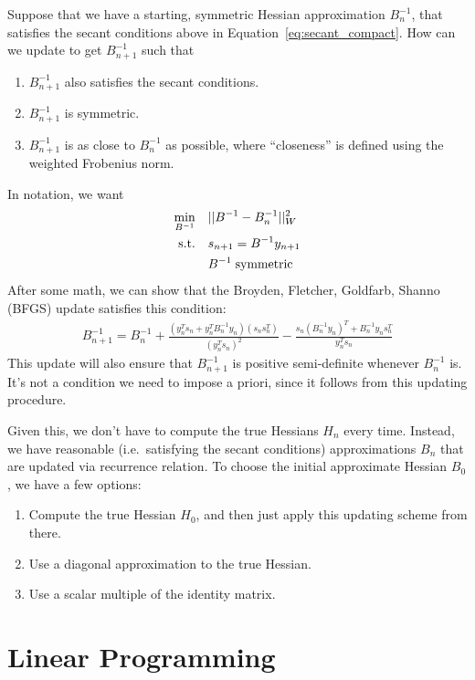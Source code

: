 \documentclass[a4paper,12pt]{scrartcl}
\theoremstyle{definition}
\theoremstyle{remark}
\begin{document}
Suppose that we have a starting, symmetric Hessian approximation $B^{-1}_n$,
that satisfies the secant conditions above in
Equation~\ref{eq:secant_compact}. How can we update to get $B^{-1}_{n+1}$
such that
\begin{enumerate}
  \item $B^{-1}_{n+1}$ also satisfies the secant conditions.
  \item $B^{-1}_{n+1}$ is symmetric.
  \item $B^{-1}_{n+1}$ is as close to $B^{-1}_n$ as possible, where
    ``closeness'' is defined using the weighted Frobenius norm.
\end{enumerate}
In notation, we want
\begin{align*}
  \min_{B^{-1}} &\quad ||B^{-1} - B^{-1}_n||^2_W \\
  \text{s.t.} &\quad s_{n+1} = B^{-1}y_{n+1} \\
              &\quad B^{-1} \text{\;symmetric}
\end{align*}
After some math, we can show that the Broyden, Fletcher, Goldfarb,
Shanno (BFGS) update satisfies this condition:
\begin{align}
  B_{n+1}^{-1} = B^{-1}_n
  + \frac{(y_n^T s_n + y_n^T B^{-1}_n y_n)(s_n s_n^T)}{(y_n^T s_n)^2}
  - \frac{s_n (B^{-1}_n y_n)^T + B^{-1}_n y_n s_n^T}{y_n^T s_n}
  \label{eq:bfgs}
\end{align}
This update will also ensure that $B^{-1}_{n+1}$ is positive
semi-definite whenever $B^{-1}_n$ is. It's not a condition we need to
impose a priori, since it follows from this updating procedure.

Given this, we don't have to compute the true Hessians $H_n$ every time.
Instead, we have reasonable (i.e.\ satisfying the secant conditions)
approximations $B_n$ that are updated via recurrence relation. To choose
the initial approximate Hessian $B_0$, we have a few options:
\begin{enumerate}
  \item Compute the true Hessian $H_0$, and then just apply this
    updating scheme from there.
  \item Use a diagonal approximation to the true Hessian.
  \item Use a scalar multiple of the identity matrix.
\end{enumerate}


\section{Linear Programming}
\end{document}
